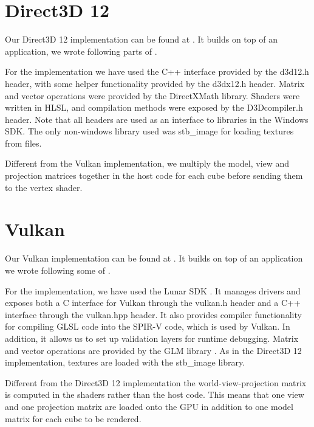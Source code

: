 \section{Direct3D 12}
Our Direct3D 12 implementation can be found at \cite{DX12Git}.
It builds on top of an application, we wrote following parts of \cite{DX12Tutorial}.

For the implementation we have used the C++ interface provided by the d3d12.h header, with some helper functionality provided by the d3dx12.h header.
Matrix and vector operations were provided by the DirectXMath library. Shaders were written in \gls{HLSL}, and compilation methods were exposed by the D3Dcompiler.h header. Note that all headers are used as an interface to libraries in the Windows SDK. The only non-windows library used was stb\_image for loading textures from files\cite{StbGit}.

Different from the Vulkan implementation, we multiply the model, view and projection matrices together in the host code for each cube before sending them to the vertex shader.    


\section{Vulkan}
Our Vulkan implementation can be found at \cite{VulkanGit}.
It builds on top of an application we wrote following some of \citet{DX12Tutorial}.

For the implementation, we have used the Lunar SDK \cite{LunarSDK}. It manages drivers and exposes both a C interface for Vulkan through the vulkan.h header and a C++ interface through the vulkan.hpp header. It also provides compiler functionality for compiling \gls{GLSL} code into the SPIR-V code, which is used by Vulkan. In addition, it allows us to set up validation layers for runtime debugging. Matrix and vector operations are provided by the GLM library \cite{GLM}. As in the Direct3D 12 implementation, textures are loaded with the stb\_image library. 

Different from the Direct3D 12 implementation the world-view-projection matrix is computed in the shaders rather than the host code.
This means that one view and one projection matrix are loaded onto the \gls{GPU} in addition to one model matrix for each cube to be rendered.